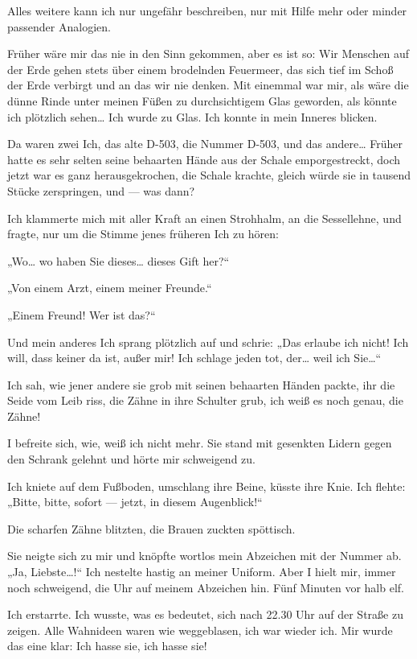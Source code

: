 Alles weitere kann ich nur ungefähr beschreiben, nur mit Hilfe mehr
oder minder passender Analogien.

Früher wäre mir das nie in den Sinn gekommen, aber es ist so: Wir
Menschen auf der Erde gehen stets über einem brodelnden Feuermeer,
das sich tief im Schoß der Erde verbirgt und an das wir nie denken.
Mit einemmal war mir, als wäre die dünne Rinde unter meinen Füßen
zu durchsichtigem Glas geworden, als könnte ich plötzlich sehen\ldots{}
Ich wurde zu Glas. Ich konnte in mein Inneres blicken.

Da waren zwei Ich, das alte D-503, die Nummer D-503, und das
andere\ldots{} Früher hatte es sehr selten seine behaarten Hände aus der
Schale emporgestreckt, doch jetzt war es ganz herausgekrochen, die
Schale krachte, gleich würde sie in tausend Stücke zerspringen, und
— was dann?

Ich klammerte mich mit aller Kraft an einen Strohhalm, an die
Sessellehne, und fragte, nur um die Stimme jenes früheren Ich zu
hören:

„Wo\ldots{} wo haben Sie dieses\ldots{} dieses Gift her?“

„Von einem Arzt, einem meiner Freunde.“

„Einem Freund! Wer ist das?“

Und mein anderes Ich sprang plötzlich auf und schrie: „Das erlaube
ich nicht! Ich will, dass keiner da ist, außer mir! Ich schlage
jeden tot, der\ldots{} weil ich Sie\ldots{}“

Ich sah, wie jener andere sie
grob mit seinen behaarten Händen packte, ihr die Seide vom Leib
riss, die Zähne in ihre Schulter grub, ich weiß es noch genau, die
Zähne!

I befreite sich, wie, weiß ich nicht mehr. Sie stand mit
gesenkten Lidern gegen den Schrank gelehnt und hörte mir schweigend
zu.

Ich kniete auf dem Fußboden, umschlang ihre Beine, küsste ihre
Knie. Ich flehte: „Bitte, bitte, sofort — jetzt, in diesem
Augenblick!“

Die scharfen Zähne blitzten, die Brauen zuckten
spöttisch.

Sie neigte sich zu mir und knöpfte wortlos mein Abzeichen mit der
Nummer ab. „Ja, Liebste\ldots{}!“ Ich nestelte hastig an meiner Uniform.
Aber I hielt mir, immer noch schweigend, die Uhr auf meinem
Abzeichen hin. Fünf Minuten vor halb elf.

Ich erstarrte. Ich wusste, was es bedeutet, sich nach 22.30 Uhr auf
der Straße zu zeigen. Alle Wahnideen waren wie weggeblasen, ich war
wieder ich. Mir wurde das eine klar: Ich hasse sie, ich hasse sie!

